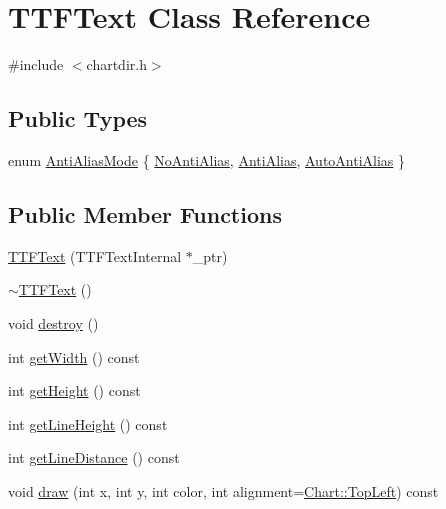 \hypertarget{class_t_t_f_text}{}\section{T\+T\+F\+Text Class Reference}
\label{class_t_t_f_text}


{\ttfamily \#include $<$chartdir.\+h$>$}

\subsection*{Public Types}
\begin{DoxyCompactItemize}
\item 
enum \hyperlink{class_t_t_f_text_af454c4b75744037f4231f4166b7ae614}{Anti\+Alias\+Mode} \{ \hyperlink{class_t_t_f_text_af454c4b75744037f4231f4166b7ae614a8b95d39bea86021217799d6428806086}{No\+Anti\+Alias}, 
\hyperlink{class_t_t_f_text_af454c4b75744037f4231f4166b7ae614a43e26dc2088b1d6f7cbde93dda686b44}{Anti\+Alias}, 
\hyperlink{class_t_t_f_text_af454c4b75744037f4231f4166b7ae614a153f2e7bf0b1759676fa5d6f4449f4a1}{Auto\+Anti\+Alias}
 \}
\end{DoxyCompactItemize}
\subsection*{Public Member Functions}
\begin{DoxyCompactItemize}
\item 
\hyperlink{class_t_t_f_text_a1a96ccfb11420cb0ec8a72665d58797d}{T\+T\+F\+Text} (T\+T\+F\+Text\+Internal $\ast$\+\_\+ptr)
\item 
\hyperlink{class_t_t_f_text_a5839927acde57372a22bfb427ebfda40}{$\sim$\+T\+T\+F\+Text} ()
\item 
void \hyperlink{class_t_t_f_text_ac5326f4aab2d131d28e22906ec95a793}{destroy} ()
\item 
int \hyperlink{class_t_t_f_text_a3d9fccb0597e54946f36987ae76327a1}{get\+Width} () const
\item 
int \hyperlink{class_t_t_f_text_a0b41f8472f607369f6a0eda4a6b5f84f}{get\+Height} () const
\item 
int \hyperlink{class_t_t_f_text_a3752a7851404645f3f541cf568855f3c}{get\+Line\+Height} () const
\item 
int \hyperlink{class_t_t_f_text_a8d6ad88e723107bfa033dc699310ce1d}{get\+Line\+Distance} () const
\item 
void \hyperlink{class_t_t_f_text_a28c985af7f82f03fd73747c5d565b8c1}{draw} (int x, int y, int color, int alignment=\hyperlink{namespace_chart_ae222e51ce11a254450b6ddfbc862680aa0bf92d1d2d6713aa62e92b86b9a8532f}{Chart\+::\+Top\+Left}) const
\end{DoxyCompactItemize}
